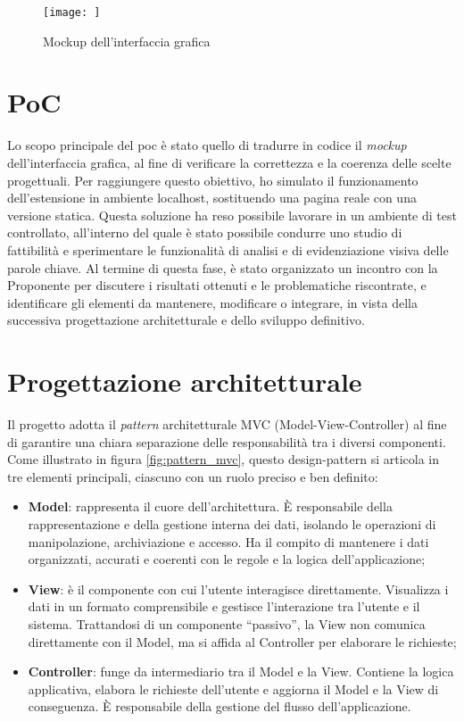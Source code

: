 \begin{figure}[H]
  \centering 
  \texttt{[image: ]}
  \caption{Mockup dell'interfaccia grafica}
  \label{fig:mockup}
\end{figure}

\section{PoC}
\label{sec:poc}

\par Lo scopo principale del \gls{poc} è stato quello di tradurre in codice il \textit{mockup} dell’interfaccia grafica, al fine di verificare la correttezza e la coerenza delle scelte progettuali. Per raggiungere questo obiettivo, ho simulato il funzionamento dell’estensione in ambiente \gls{localhost}, sostituendo una pagina reale con una versione statica. Questa soluzione ha reso possibile lavorare in un ambiente di test controllato, all’interno del quale è stato possibile condurre uno studio di fattibilità e sperimentare le funzionalità di analisi e di evidenziazione visiva delle parole chiave. Al termine di questa fase, è stato organizzato un incontro con la Proponente per discutere i risultati ottenuti e le problematiche riscontrate, e identificare gli elementi da mantenere, modificare o integrare, in vista della successiva progettazione architetturale e dello sviluppo definitivo.

\section{Progettazione architetturale}
\label{sec:progettazione}

\par Il progetto adotta il \textit{pattern} architetturale MVC (Model-View-Controller) al fine di garantire una chiara separazione delle responsabilità tra i diversi componenti. Come illustrato in figura \ref{fig:pattern_mvc}, questo \gls{design-pattern} si articola in tre elementi principali, ciascuno con un ruolo preciso e ben definito:
\begin{itemize}
  \item \textbf{Model}: rappresenta il cuore dell’architettura. È responsabile della rappresentazione e della gestione interna dei dati, isolando le operazioni di manipolazione, archiviazione e accesso. Ha il compito di mantenere i dati organizzati, accurati e coerenti con le regole e la logica dell’applicazione;
  \item \textbf{View}: è il componente con cui l’utente interagisce direttamente. Visualizza i dati in un formato comprensibile e gestisce l’interazione tra l’utente e il sistema. Trattandosi di un componente “passivo”, la View non comunica direttamente con il Model, ma si affida al Controller per elaborare le richieste;
  \item \textbf{Controller}: funge da intermediario tra il Model e la View. Contiene la logica applicativa, elabora le richieste dell’utente e aggiorna il Model e la View di conseguenza. È responsabile della gestione del flusso dell’applicazione.
\end{itemize}

